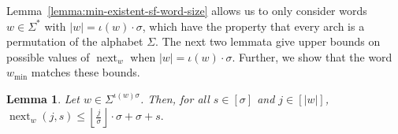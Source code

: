 \documentclass[10pt,a4paper]{amsart}
\DeclareMathOperator{\nextAlphPos}{next}
\newif\ifpaper
\theoremstyle{plain}
\newtheorem{lemma}{Lemma}
\theoremstyle{definition}
\begin{document}
Lemma~\ref{lemma:min-existent-sf-word-size} allows us to only consider words $w\in\Sigma^*$ with $|w| = \iota(w)\cdot \sigma$, which have the property that every arch is a permutation of the alphabet $\Sigma$.
The next two lemmata give upper bounds on possible values of $\nextAlphPos_w$ when $|w| = \iota(w)\cdot\sigma$. Further, we show that the word $w_{\min}$ matches these bounds.

\begin{lemma}\label{lemma:shortest-w-next-function-upper-bound}
    Let $w\in\Sigma^{\iota(w) \sigma}$. Then, for all $s \in [\sigma]$ and $j\in[|w|]$,
    $ \nextAlphPos_w(j,s) \leq \left\lfloor\frac{j}{\sigma}\right\rfloor\cdot\sigma + \sigma + s. $
\end{lemma}
\ifpaper
\else
\end{document}
